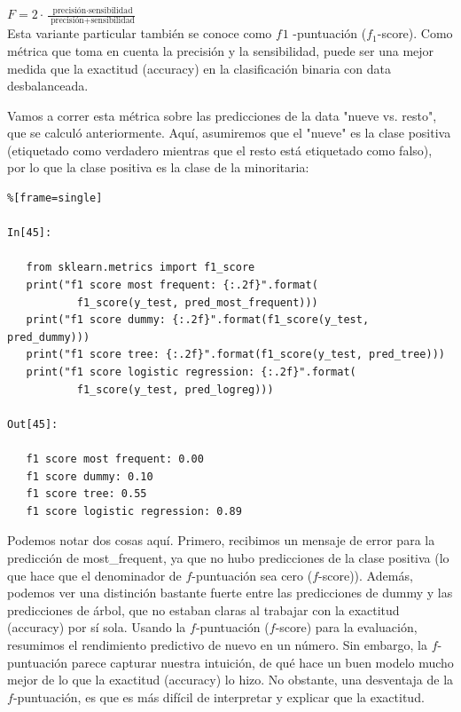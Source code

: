 {$ F = 2 \cdot \frac{\text{ precisión} \cdot \text{sensibilidad}}{\text{ precisión}
	 + \text{sensibilidad}}  $ \\

Esta variante particular también se conoce como $f_{}1$ -puntuación  ($f_{1}$-score).  Como métrica que  toma en cuenta  la  precisión y la sensibilidad, puede ser una mejor medida que la exactitud  (accuracy) en la clasificación binaria con  data desbalanceada. 

Vamos a correr esta métrica sobre las predicciones de la data  "{}nueve vs. resto"{},  que 
se calculó  anteriormente.  Aquí, asumiremos que el "{}nueve"{} es la clase positiva (etiquetado como verdadero mientras que el resto está etiquetado como falso), por lo que la clase positiva es la clase de la minoritaria:  

\begin{lstlisting}%[frame=single]

In[45]:

   from sklearn.metrics import f1_score
   print("f1 score most frequent: {:.2f}".format(
           f1_score(y_test, pred_most_frequent)))
   print("f1 score dummy: {:.2f}".format(f1_score(y_test, pred_dummy)))
   print("f1 score tree: {:.2f}".format(f1_score(y_test, pred_tree)))
   print("f1 score logistic regression: {:.2f}".format(
           f1_score(y_test, pred_logreg)))

Out[45]:

   f1 score most frequent: 0.00
   f1 score dummy: 0.10
   f1 score tree: 0.55
   f1 score logistic regression: 0.89

\end{lstlisting}


Podemos notar dos cosas aquí. Primero, recibimos un mensaje de error para  la predicción de  {\ttfamily most\_frequent}, ya que no hubo predicciones de la clase positiva (lo que hace que el
denominador de $f$-puntuación sea cero ($f$-score)).   Además, podemos ver una distinción bastante fuerte entre
las predicciones de dummy  y las predicciones de árbol, que no estaban claras al trabajar con la
exactitud (accuracy) por sí sola. 
Usando la $f$-puntuación ($f$-score)  para la evaluación, resumimos el rendimiento predictivo de nuevo en un número.  Sin embargo, la $f$-puntuación  parece capturar nuestra intuición, de qué hace  un buen modelo mucho mejor de lo que la exactitud (accuracy) lo hizo.   No obstante, una desventaja de la $f$-puntuación,  es que es más difícil de interpretar y explicar que la exactitud.\\
 
}
